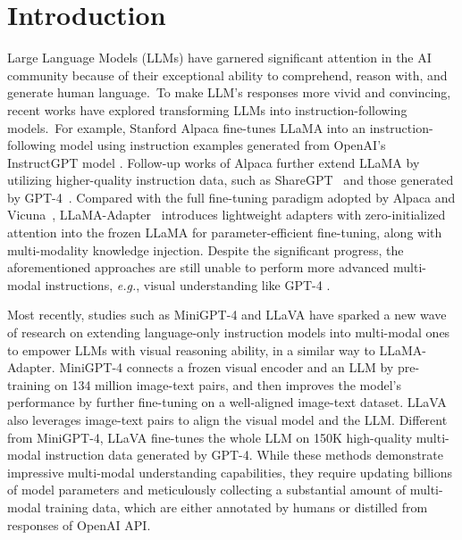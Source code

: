 \documentclass[10pt,twocolumn,letterpaper]{article}
\begin{document}
\section{Introduction}
\label{sec:intro}

Large Language Models (LLMs) \cite{zhao2023survey} have garnered significant attention in the AI community because of their exceptional ability to comprehend, reason with, and generate human language.~To make LLM's responses more vivid and convincing, recent works \cite{alpaca,vicuna2023,peng2023instruction,koala_blogpost_2023,xu2023baize} have explored transforming LLMs into instruction-following models.~For example, Stanford Alpaca \cite{alpaca} fine-tunes LLaMA \cite{touvron2023llama} into an instruction-following model using instruction examples generated from OpenAI's InstructGPT model \cite{ouyang2022training}. Follow-up works of Alpaca further extend LLaMA by utilizing higher-quality instruction data, such as ShareGPT~\cite{sharegpt} and those generated by GPT-4~\cite{peng2023instruction}. Compared with the full fine-tuning paradigm adopted by Alpaca and Vicuna~\cite{vicuna2023}, LLaMA-Adapter~\cite{llamaadapter2023} introduces lightweight adapters with zero-initialized attention into the frozen LLaMA for parameter-efficient fine-tuning, along with multi-modality knowledge injection. Despite the significant progress, the aforementioned approaches are still unable to perform more advanced multi-modal instructions, \emph{e.g.}, visual understanding like GPT-4 \cite{OpenAI2023GPT4TR}.

Most recently, studies such as MiniGPT-4 \cite{zou2022xdecoder} and LLaVA \cite{liu2023visual} have sparked a new wave of research on extending language-only instruction models into multi-modal ones to empower LLMs with visual reasoning ability, in a similar way to LLaMA-Adapter. MiniGPT-4 connects a frozen visual encoder and an LLM by pre-training on 134 million image-text pairs, and then improves the model's performance by further fine-tuning on a well-aligned image-text dataset. LLaVA also leverages image-text pairs to align the visual model and the LLM. Different from MiniGPT-4, LLaVA fine-tunes the whole LLM on 150K high-quality multi-modal instruction data generated by GPT-4. While these methods demonstrate impressive multi-modal understanding capabilities, they require updating billions of model parameters and meticulously collecting a substantial amount of multi-modal training data, which are either annotated by humans or distilled from responses of OpenAI API.
\end{document}
